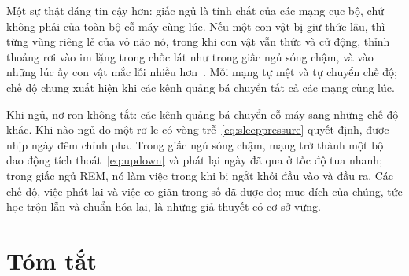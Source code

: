 Một sự thật đáng tin cậy hơn: giấc ngủ là tính chất của các mạng cục bộ, chứ không phải của toàn bộ cỗ máy cùng lúc. Nếu một con vật bị giữ thức lâu, thì từng vùng riêng lẻ của vỏ não nó, trong khi con vật vẫn thức và cử động, thỉnh thoảng rơi vào im lặng trong chốc lát như trong giấc ngủ sóng chậm, và vào những lúc ấy con vật mắc lỗi nhiều hơn~\cite{Vyazovskiy2011}. Mỗi mạng tự mệt và tự chuyển chế độ; chế độ chung xuất hiện khi các kênh quảng bá chuyển tất cả các mạng cùng lúc.

\begin{keyblock}
\begin{proposition}
\label{prop:sleep}
Khi ngủ, nơ-ron không tắt: các kênh quảng bá chuyển cỗ máy sang những chế độ khác. Khi nào ngủ do một rơ-le có vòng trễ~\eqref{eq:sleeppressure} quyết định, được nhịp ngày đêm chỉnh pha. Trong giấc ngủ sóng chậm, mạng trở thành một bộ dao động tích thoát~\eqref{eq:updown} và phát lại ngày đã qua ở tốc độ tua nhanh; trong giấc ngủ REM, nó làm việc trong khi bị ngắt khỏi đầu vào và đầu ra. Các chế độ, việc phát lại và việc co giãn trọng số đã được đo; mục đích của chúng, tức học trộn lẫn và chuẩn hóa lại, là những giả thuyết có cơ sở vững.
\end{proposition}
\end{keyblock}

\section{Tóm tắt}

